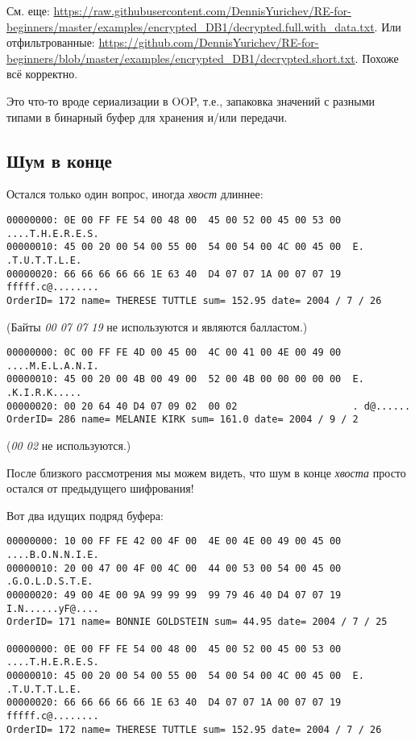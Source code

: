 См. еще: \url{https://raw.githubusercontent.com/DennisYurichev/RE-for-beginners/master/examples/encrypted_DB1/decrypted.full.with_data.txt}.
Или отфильтрованные: \url{https://github.com/DennisYurichev/RE-for-beginners/blob/master/examples/encrypted_DB1/decrypted.short.txt}.
Похоже всё корректно.

Это что-то вроде сериализации в \ac{OOP}, т.е., запаковка значений с разными типами в бинарный буфер для хранения и/или
передачи.

\subsection{Шум в конце}

Остался только один вопрос, иногда \emph{хвост} длиннее:

\begin{lstlisting}
00000000: 0E 00 FF FE 54 00 48 00  45 00 52 00 45 00 53 00  ....T.H.E.R.E.S.
00000010: 45 00 20 00 54 00 55 00  54 00 54 00 4C 00 45 00  E. .T.U.T.T.L.E.
00000020: 66 66 66 66 66 1E 63 40  D4 07 07 1A 00 07 07 19  fffff.c@........
OrderID= 172 name= THERESE TUTTLE sum= 152.95 date= 2004 / 7 / 26
\end{lstlisting}

(Байты \emph{00 07 07 19} не используются и являются балластом.)

\begin{lstlisting}
00000000: 0C 00 FF FE 4D 00 45 00  4C 00 41 00 4E 00 49 00  ....M.E.L.A.N.I.
00000010: 45 00 20 00 4B 00 49 00  52 00 4B 00 00 00 00 00  E. .K.I.R.K.....
00000020: 00 20 64 40 D4 07 09 02  00 02                    . d@......
OrderID= 286 name= MELANIE KIRK sum= 161.0 date= 2004 / 9 / 2
\end{lstlisting}

(\emph{00 02} не используются.)

После близкого рассмотрения мы можем видеть, что шум в конце \emph{хвоста} просто остался от предыдущего
шифрования!

Вот два идущих подряд буфера:

\begin{lstlisting}
00000000: 10 00 FF FE 42 00 4F 00  4E 00 4E 00 49 00 45 00  ....B.O.N.N.I.E.
00000010: 20 00 47 00 4F 00 4C 00  44 00 53 00 54 00 45 00   .G.O.L.D.S.T.E.
00000020: 49 00 4E 00 9A 99 99 99  99 79 46 40 D4 07 07 19  I.N......yF@....
OrderID= 171 name= BONNIE GOLDSTEIN sum= 44.95 date= 2004 / 7 / 25

00000000: 0E 00 FF FE 54 00 48 00  45 00 52 00 45 00 53 00  ....T.H.E.R.E.S.
00000010: 45 00 20 00 54 00 55 00  54 00 54 00 4C 00 45 00  E. .T.U.T.T.L.E.
00000020: 66 66 66 66 66 1E 63 40  D4 07 07 1A 00 07 07 19  fffff.c@........
OrderID= 172 name= THERESE TUTTLE sum= 152.95 date= 2004 / 7 / 26
\end{lstlisting}

